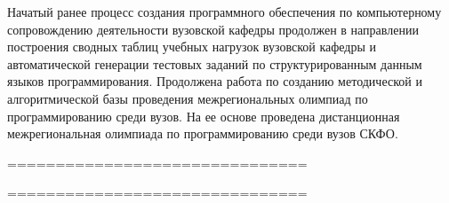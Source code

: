 Начатый ранее процесс создания программного обеспечения по компьютерному сопровождению деятельности вузовской кафедры продолжен в направлении построения сводных таблиц учебных нагрузок вузовской кафедры и автоматической генерации тестовых заданий по структурированным данным языков программирования.
Продолжена работа по созданию методической и алгоритмической базы проведения межрегиональных олимпиад по программированию среди вузов. На ее основе проведена дистанционная межрегиональная олимпиада по программированию среди вузов СКФО.






===============================





































===============================



%
%


